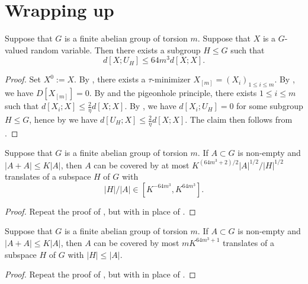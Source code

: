 \section{Wrapping up}

\begin{theorem}\label{main-entropy} Suppose that $G$ is a finite abelian group of torsion $m$.  Suppose that $X$ is a $G$-valued random variable. Then there exists a subgroup $H \leq G$ such that \[ d[X;U_H] \leq 64 m^3 d[X;X].\]
\end{theorem}

\begin{proof}  Set $X^0 := X$. By , there exists a $\tau$-minimizer $X_{[m]} = (X_i)_{1 \leq i \leq m}$.  By , we have $D[X_{[m]}]=0$. By  and the pigeonhole principle, there exists $1 \leq i \leq m$ such that $d[X_i; X] \leq \frac{2}{\eta} d[X;X]$.  By , we have $d[X_i;U_H]=0$ for some subgroup $H \leq G$, hence by  we have $d[U_H; X] \leq \frac{2}{\eta} d[X;X]$. The claim then follows from .
\end{proof}

\begin{lemma}\label{pfr_aux_torsion}  Suppose that $G$ is a finite abelian group of torsion $m$.  If $A \subset G$ is non-empty and
  $|A+A| \leq K|A|$, then $A$ can be covered by at most $K ^
  {(64m^3+2)/2}|A|^{1/2}/|H|^{1/2}$ translates of a subspace $H$ of $G$ with
  \begin{equation}
    \label{ah2}
    |H|/|A| \in [K^{-64m^3}, K^{64m^3}].
  \end{equation}
  \end{lemma}

\begin{proof}  Repeat the proof of , but with  in place of .
\end{proof}

\begin{theorem}[PFR]\label{pfr-torsion}  Suppose that $G$ is a finite abelian group of torsion $m$.
  If $A \subset G$ is non-empty and $|A+A| \leq K|A|$, then $A$ can be covered by most $mK^{64m^3+1}$ translates of a subspace $H$ of $G$ with $|H| \leq |A|$.
  \end{theorem}

  \begin{proof} Repeat the proof of , but with  in place of .
  \end{proof}
